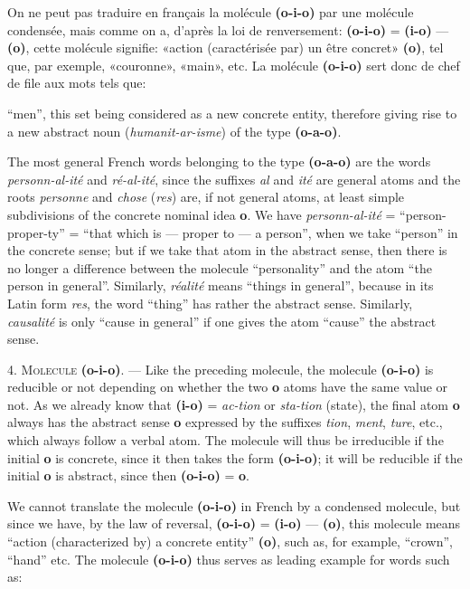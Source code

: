 \begin{sloppypar}
{{    On ne peut pas traduire en français la molécule
    \textbf{(o-i-o)} par une molécule condensée, mais comme
    on a, d’après la loi de renversement: \textbf{(o-i-o)} =
    \textbf{(i-o)} — \textbf{(o)}, cette molécule signifie:
    «action (caractérisée par) un être concret» \textbf{(o)},
    tel que, par exemple, «couronne», «main», etc. La molécule
    \textbf{(o-i-o)} sert donc de chef de file aux mots tels
    que:}

}
%
{\noindent
  {\small
    ``men'', this set being considered as a new concrete entity,
    therefore giving rise to a new abstract noun (\emph{humanit-ar-isme}) of
    the type \textbf{(o-a-o)}.

    The most general French words belonging to the type
    \textbf{(o-a-o)} are the words \emph{personn-al-ité} and
    \emph{ré-al-ité}, since the suffixes \emph{al} and \emph{ité} are
    general atoms and the roots \emph{personne} and \emph{chose}
    (\emph{res}) are, if not general atoms, at least simple
    subdivisions of the concrete nominal idea \textbf{o}. We
    have \emph{personn-al-ité} = ``person-proper-ty'' = ``that which is
    --- proper to --- a person'', when we take ``person'' in the
    concrete sense; but if we take that atom in the abstract sense,
    then there is no longer a difference between the molecule
    ``personality'' and the atom ``the person in general''.
    Similarly, \emph{réalité} means ``things in general'', because in
    its Latin form \emph{res}, the word ``thing'' has rather the
    abstract sense. Similarly, \emph{causalité} is only ``cause in
    general'' if one gives the atom ``cause'' the abstract sense.

    4. \textsc{Molecule} \textbf{(o-i-o)}. — Like the preceding
    molecule, the molecule \textbf{(o-i-o)} is reducible or not
    depending on whether the two \textbf{o} atoms have the same value
    or not. As we already know that \textbf{(i-o)} = \emph{ac-tion} or
    \emph{sta-tion} (state), the final atom \textbf{o} always has the
    abstract sense \textbf{o} expressed by the suffixes \emph{tion},
    \emph{ment}, \emph{ture}, etc., which always follow a verbal atom. The
    molecule will thus be irreducible if the initial \textbf{o} is
    concrete, since it then takes the form \textbf{(o-i-o)};
    it will be reducible if the initial \textbf{o} is abstract, since
    then \textbf{(o-i-o)} = \textbf{o}.

    We cannot translate the molecule \textbf{(o-i-o)} in
    French by a condensed molecule, but since we have, by the law of
    reversal, \textbf{(o-i-o)} = \textbf{(i-o)} ---
    \textbf{(o)}, this molecule means ``action (characterized
    by) a concrete entity'' \textbf{(o)}, such as, for
    example, ``crown'', ``hand'' etc. The molecule
    \textbf{(o-i-o)} thus serves as leading example for words
    such as:
    
}}
\end{sloppypar}
